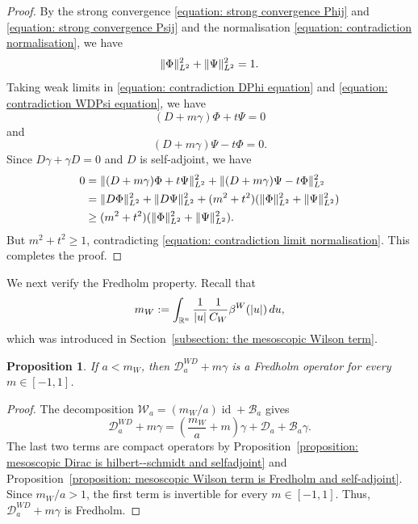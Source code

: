\documentclass[a4paper,oneside,12pt]{amsart}
\theoremstyle{plain}
\newtheorem{proposition}[theorem]{Proposition}
\theoremstyle{definition}
\theoremstyle{remark}
\newcommand{\R}{\mathbb{R}}
\DeclarePairedDelimiter{\abs}{\lvert}{\rvert}
\DeclarePairedDelimiter{\norm}{\lVert}{\rVert}
\DeclareMathOperator{\id}{id}
\newcommand{\Ltwonorm}[2][L^2]{\norm{#2}_{#1}}
\newcommand{\mesoscopicDiracoperator}[1][a]{\mathcal{D}_{#1}}
\newcommand{\mesoscopicWilsonterm}[1][a]{\mathcal{W}_{#1}}
\newcommand{\mesoscopicWilsonDiracoperator}[1][a]{\mathcal{D}_{#1}^{\mathit{WD}}}
\newcommand{\cutoff}{\beta}
\newcommand{\cutoffWilson}{\cutoff^W}
\newcommand{\mesoscopicWilsontermcompactpert}[1][a]{\mathcal{B}_{#1}}
\begin{document}
\begin{proof}
  By the strong convergence \eqref{equation: strong convergence Phij} and \eqref{equation: strong convergence Psij} and the normalisation \eqref{equation: contradiction normalisation}, we have
  \begin{equation}\label{equation: contradiction limit normalisation}
    \Ltwonorm{\Phi}^2 + \Ltwonorm{\Psi}^2 = 1.
  \end{equation}
  Taking weak limits in \eqref{equation: contradiction DPhi equation} and \eqref{equation: contradiction WDPsi equation}, we have
  \begin{equation}\label{equation: contradiction limit DPhi equation}
    (D + m\gamma) \Phi + t \Psi = 0
  \end{equation}
  and
  \begin{equation}\label{equation: contradiction limit WDPsi equation}
    (D + m\gamma) \Psi - t\Phi = 0.
  \end{equation}
  Since $D \gamma + \gamma D = 0$ and $D$ is self-adjoint, we have
  \begin{equation}
    \begin{aligned}
    0 ={}& \Ltwonorm{(D+m\gamma)\Phi + t\Psi}^2 + \Ltwonorm{(D+m\gamma)\Psi - t\Phi}^2 \\
    ={}& \Ltwonorm{D\Phi}^2 + \Ltwonorm{D\Psi}^2 + (m^2+t^2)(\Ltwonorm{\Phi}^2+\Ltwonorm{\Psi}^2) \\
    \ge{}&  (m^2+t^2)(\Ltwonorm{\Phi}^2+\Ltwonorm{\Psi}^2).
    \end{aligned}
  \end{equation}
  But $m^2+t^2 \ge 1$, contradicting \eqref{equation: contradiction limit normalisation}.
  This completes the proof.
\end{proof}

We next verify the Fredholm property.
Recall that
\begin{equation}
  m_W := \int_{\R^n} \frac{1}{\abs{u}} \frac{1}{C_W} \cutoffWilson(\abs{u}) \,du,
\end{equation}
which was introduced in Section~\ref{subsection: the mesoscopic Wilson term}.

\begin{proposition}\label{proposition: mesoscopicWD plus mgamma is Fredholm}
  If $a < m_W$, then $\mesoscopicWilsonDiracoperator + m\gamma$ is a Fredholm operator for every $m \in [-1,1]$.
\end{proposition}
\begin{proof}
  The decomposition $\mesoscopicWilsonterm = (m_W/a)\id + \mesoscopicWilsontermcompactpert$ gives
  \begin{equation}
    \mesoscopicWilsonDiracoperator + m\gamma = \left(\frac{m_W}{a} + m \right)\gamma + \mesoscopicDiracoperator + \mesoscopicWilsontermcompactpert \gamma.
  \end{equation}
  The last two terms are compact operators by Proposition~\ref{proposition: mesoscopic Dirac is hilbert--schmidt and selfadjoint} and Proposition~\ref{proposition: mesoscopic Wilson term is Fredholm and self-adjoint}.
  Since $m_W/a > 1$, the first term is invertible for every $m \in [-1,1]$.
  Thus, $\mesoscopicWilsonDiracoperator + m\gamma$ is Fredholm.
\end{proof}
\end{document}
